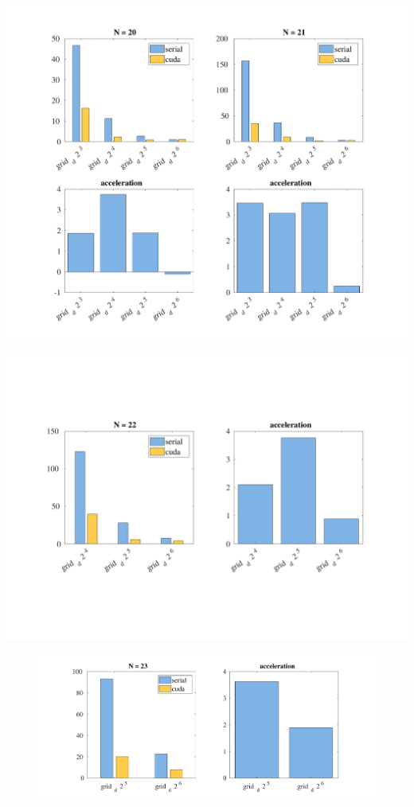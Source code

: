 \documentclass[10pt,a4paper]{article}
\begin{document}
\begin{center}
\centering
\includegraphics[scale=0.5]{cuda2021}
\end{center}

\begin{center}
\centering
\includegraphics[scale=0.5]{output}
\end{center}

\begin{figure}
\includegraphics[scale=0.5]{cuda23}
\end{figure}
\end{document}
